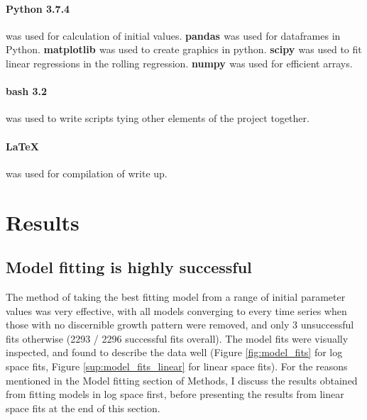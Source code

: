 \documentclass[11pt, a4paper]{article}
\begin{document}
\begin{linenumbers}
\paragraph{Python 3.7.4 \cite{python}} was used for calculation of initial values. \textbf{pandas \cite{pd}} was used for dataframes in Python. \textbf{matplotlib \cite{plt}} was used to create graphics in python. \textbf{scipy \cite{numpy}} was used to fit linear regressions in the rolling regression. \textbf{numpy \cite{numpy}} was used for efficient arrays.

\paragraph{bash 3.2} was used to write scripts tying other elements of the project together.

\paragraph{\LaTeX } was used for compilation of write up.
\section{Results}

\subsection{Model fitting is highly successful}
The method of taking the best fitting model from a range of initial parameter values was very effective, with all models converging to every time series when those with no discernible growth pattern were removed, and only 3 unsuccessful fits otherwise (2293 / 2296 successful fits overall). The model fits were visually inspected, and found to describe the data well (Figure \ref{fig:model_fits} for log space fits, Figure \ref{sup:model_fits_linear} for linear space fits). For the reasons mentioned in the Model fitting section of Methods, I discuss the results obtained from fitting models in log space first, before presenting the results from linear space fits at the end of this section.


\end{linenumbers}
\end{document}

